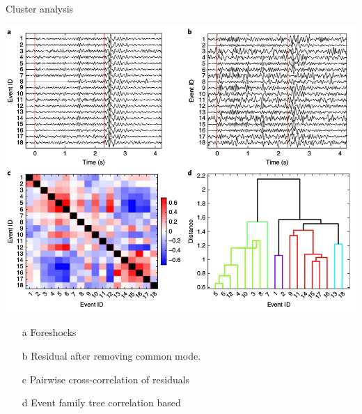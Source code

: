 \documentclass[aspectratio=43,9pt]{beamer}
\begin{document}
\begin{frame}{Cluster analysis}

  \begin{minipage}{0.7\linewidth}
   \hspace{-20pt} \includegraphics[width=1.1\linewidth]{Figs/fig_2ells.jpg}
  \end{minipage}
  \begin{minipage}{0.28\linewidth}
  \begin{itemize}
   \item[a] Foreshocks
   \vskip 0.2cm
   \item[b] Residual after removing common mode.
   \vskip 0.2cm
   \item[c] Pairwise cross-correlation of residuals
   \vskip 0.2cm
   \item[d] Event family tree correlation based
  \end{itemize}
  \end{minipage}
  
\end{frame}
\end{document}
